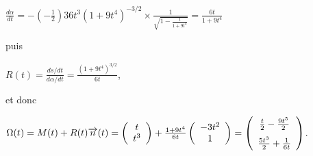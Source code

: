 {\begin{enumerate}
{\begin{center}
$\frac{d\alpha}{dt}=-\left(-\frac{1}{2}\right)36t^3(1+9t^4)^{-3/2}\times\frac{1}{\sqrt{1-\frac{1}{1+9t^4}}}=\frac{6t}{1+9t^4}$
\end{center}
puis

\begin{center}
$R(t)=\frac{ds/dt}{d\alpha/dt}=\frac{(1+9t^4)^{3/2}}{6t}$,
\end{center}
et donc

\begin{center}
$\Omega(t)=M(t)+R(t)\overrightarrow{n}(t)=\left(
\begin{array}{c}
t\\
t^3
\end{array}
\right)+
\frac{1+9t^4}{6t}\left(
\begin{array}{c}
-3t^2\\
1
\end{array}
\right)
=\left(
\begin{array}{c}
\frac{t}{2}-\frac{9t^5}{2}\\
\rule{0mm}{6mm}\frac{5t^3}{2}+\frac{1}{6t}
\end{array}
\right)$.
\end{center}

}
\end{enumerate}}
